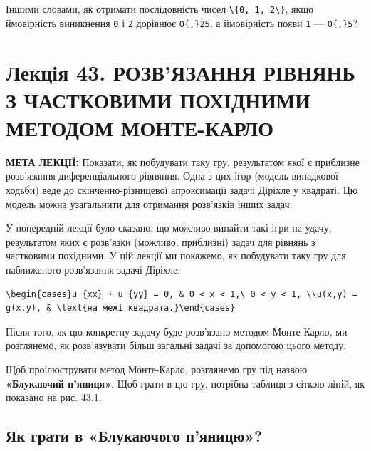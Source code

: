 \documentclass[
  ukrainian,
]{article}
\begin{document}
Іншими словами, як отримати послідовність чисел
\texttt{\textbackslash{}\{0,\ 1,\ 2\textbackslash{}\}}, якщо ймовірність
виникнення \texttt{0} і \texttt{2} дорівнює \texttt{0\{,\}25}, а
ймовірність появи \texttt{1} --- \texttt{0\{,\}5}?

\section{Лекція 43. РОЗВ'ЯЗАННЯ РІВНЯНЬ З ЧАСТКОВИМИ ПОХІДНИМИ МЕТОДОМ
МОНТЕ-КАРЛО}\label{ux43bux435ux43aux446ux456ux44f-43.-ux440ux43eux437ux432ux44fux437ux430ux43dux43dux44f-ux440ux456ux432ux43dux44fux43dux44c-ux437-ux447ux430ux441ux442ux43aux43eux432ux438ux43cux438-ux43fux43eux445ux456ux434ux43dux438ux43cux438-ux43cux435ux442ux43eux434ux43eux43c-ux43cux43eux43dux442ux435-ux43aux430ux440ux43bux43e}

\textbf{МЕТА ЛЕКЦІЇ:} Показати, як побудувати таку гру, результатом якої
є приблизне розв'язання диференціального рівняння. Одна з цих ігор
(модель випадкової ходьби) веде до скінченно-різницевої апроксимації
задачі Діріхле у квадраті. Цю модель можна узагальнити для отримання
розв'язків інших задач.

У попередній лекції було сказано, що можливо винайти такі ігри на удачу,
результатом яких є розв'язки (можливо, приблизні) задач для рівнянь з
частковими похідними. У цій лекції ми покажемо, як побудувати таку гру
для наближеного розв'язання задачі Діріхле:

\begin{verbatim}
\begin{cases}u_{xx} + u_{yy} = 0, & 0 < x < 1,\ 0 < y < 1, \\u(x,y) = g(x,y), & \text{на межі квадрата.}\end{cases}
\end{verbatim}

Після того, як цю конкретну задачу буде розв'язано методом Монте-Карло,
ми розглянемо, як розв'язувати більш загальні задачі за допомогою цього
методу.

Щоб проілюструвати метод Монте-Карло, розглянемо гру під назвою
\textbf{«Блукаючий п'яниця»}. Щоб грати в цю гру, потрібна таблиця з
сіткою ліній, як показано на рис. 43.1.

\subsection{Як грати в «Блукаючого
п'яницю»?}\label{ux44fux43a-ux433ux440ux430ux442ux438-ux432-ux431ux43bux443ux43aux430ux44eux447ux43eux433ux43e-ux43fux44fux43dux438ux446ux44e}
\end{document}
